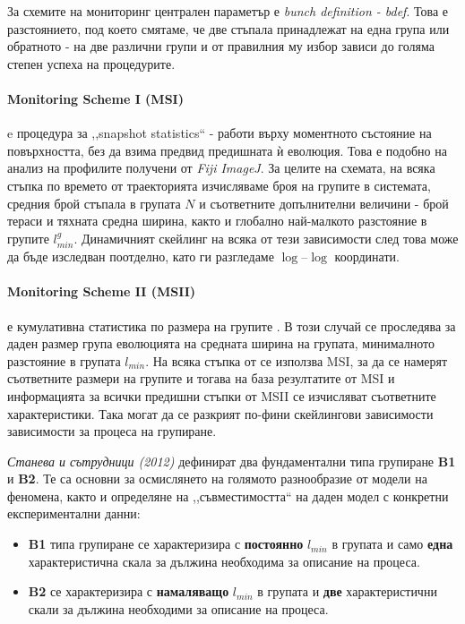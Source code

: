 За схемите на мониторинг централен параметър е \textit{bunch definition - bdef}. Това е разстоянието, под което смятаме, че две стъпала принадлежат на една група или обратното - на две различни групи и от правилния му избор зависи до голяма степен успеха на процедурите.

\paragraph{Monitoring Scheme I (MSI)} e процедура за ,,snapshot statistics`` \cite{TonchevArxiv2012} - работи върху моментното състояние на повърхността, без да взима предвид предишната ѝ еволюция. Това е подобно на анализ на профилите получени от \textit{Fiji ImageJ}. За целите на схемата, на всяка стъпка по времето от траекторията изчисляваме броя на групите в системата, средния брой стъпала в групата $N$ и съответните допълнителни величини - брой тераси и тяхната средна ширина, както и глобално най-малкото разстояние в групите $l_{min}^g$. Динамичният скейлинг на всяка от тези зависимости след това може да бъде изследван поотделно, като ги разгледаме $\log\mbox{--}\log$ координати.

\paragraph{Monitoring Scheme II (MSII)} е кумулативна статистика по размера на групите \cite{TonchevArxiv2012}. В този случай се проследява за даден размер група еволюцията на средната ширина на групата, минималното разстояние в групата $l_{min}$. На всяка стъпка от се използва MSI, за да се намерят съответните размери на групите и тогава на база резултатите от MSI и информацията за всички предишни стъпки от MSII се изчисляват съответните характеристики. Така могат да се разкрият по-фини скейлингови зависимости зависимости за процеса на групиране.

\textit{Станева и сътрудници (2012)} \cite{Staneva2012} дефинират два фундаментални типа групиране \textbf{B1} и \textbf{B2}. Те са основни за осмислянето на голямото разнообразие от модели на феномена, както и определяне на ,,съвместимостта`` на даден модел с конкретни експериментални данни:
\begin{itemize}
    \item \textbf{B1} типа групиране се характеризира с \textbf{постоянно} $l_{min}$ в групата и само \textbf{една} характеристична скала за дължина необходима за описание на процеса.
    \item \textbf{B2} се характеризира с \textbf{намаляващо} $l_{min}$ в групата и \textbf{две} характеристични скали за дължина необходими за описание на процеса.
\end{itemize}

